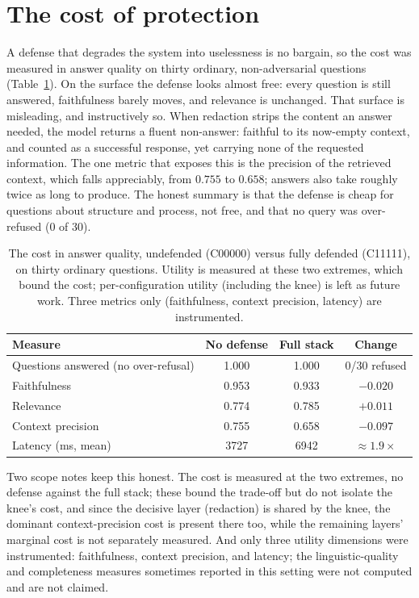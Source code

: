 \documentclass[12pt,a4paper]{report}
\begin{document}
\section{The cost of protection}
\label{sec:ch6-cost}

A defense that degrades the system into uselessness is no bargain, so the cost was measured in
answer quality on thirty ordinary, non-adversarial questions (Table~\ref{tab:ch6-utility}). On
the surface the defense looks almost free: every question is still answered, faithfulness barely
moves, and relevance is unchanged. That surface is misleading, and instructively so. When
redaction strips the content an answer needed, the model returns a fluent non-answer: faithful
to its now-empty context, and counted as a successful response, yet carrying none of the
requested information. The one metric that exposes this is the precision of the retrieved
context, which falls appreciably, from $0.755$ to $0.658$; answers also take roughly twice as
long to produce. The honest summary is that the defense is cheap for questions about structure
and process, not free, and that no query was over-refused (0 of 30).

\begin{table}[h]
\centering
\caption[The cost in answer quality at the two extremes]{The cost in answer quality, undefended (C00000) versus fully defended (C11111), on
thirty ordinary questions. Utility is measured at these two extremes, which bound the cost;
per-configuration utility (including the knee) is left as future work. Three metrics only
(faithfulness, context precision, latency) are instrumented.}
\label{tab:ch6-utility}
\begin{tabular}{lccc}
\toprule
\textbf{Measure} & \textbf{No defense} & \textbf{Full stack} & \textbf{Change}\\
\midrule
Questions answered (no over-refusal) & 1.000 & 1.000 & 0/30 refused\\
Faithfulness & 0.953 & 0.933 & $-0.020$\\
Relevance & 0.774 & 0.785 & $+0.011$\\
Context precision & 0.755 & 0.658 & \textbf{$-0.097$}\\
Latency (ms, mean) & 3727 & 6942 & $\approx 1.9\times$\\
\bottomrule
\end{tabular}
\end{table}

Two scope notes keep this honest. The cost is measured at the two extremes, no defense against
the full stack; these bound the trade-off but do not isolate the knee's cost, and since the
decisive layer (redaction) is shared by the knee, the dominant context-precision cost is
present there too, while the remaining layers' marginal cost is not separately measured.
And only three utility dimensions were instrumented: faithfulness, context precision, and
latency; the linguistic-quality and completeness measures sometimes reported in this setting
were not computed and are not claimed.
\end{document}
